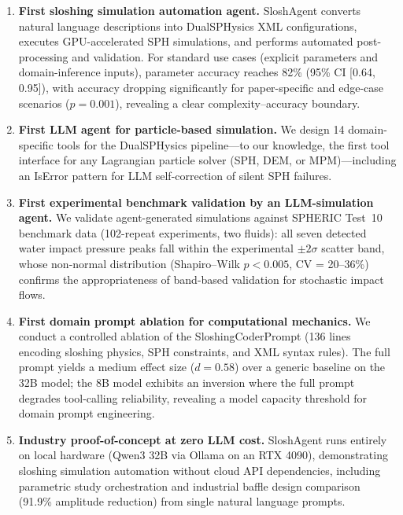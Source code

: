 \documentclass[11pt]{article}
\begin{document}
\begin{enumerate}[noitemsep]
  \item \textbf{First sloshing simulation automation agent.} SloshAgent converts natural language descriptions into DualSPHysics XML configurations, executes GPU-accelerated SPH simulations, and performs automated post-processing and validation. For standard use cases (explicit parameters and domain-inference inputs), parameter accuracy reaches 82\% (95\% CI [0.64, 0.95]), with accuracy dropping significantly for paper-specific and edge-case scenarios ($p = 0.001$), revealing a clear complexity--accuracy boundary.

  \item \textbf{First LLM agent for particle-based simulation.} We design 14 domain-specific tools for the DualSPHysics pipeline---to our knowledge, the first tool interface for any Lagrangian particle solver (SPH, DEM, or MPM)---including an IsError pattern for LLM self-correction of silent SPH failures.

  \item \textbf{First experimental benchmark validation by an LLM-simulation agent.} We validate agent-generated simulations against SPHERIC Test~10 benchmark data (102-repeat experiments, two fluids): all seven detected water impact pressure peaks fall within the experimental $\pm 2\sigma$ scatter band, whose non-normal distribution (Shapiro--Wilk $p < 0.005$, CV = 20--36\%) confirms the appropriateness of band-based validation for stochastic impact flows.

  \item \textbf{First domain prompt ablation for computational mechanics.} We conduct a controlled ablation of the SloshingCoderPrompt (136 lines encoding sloshing physics, SPH constraints, and XML syntax rules). The full prompt yields a medium effect size ($d = 0.58$) over a generic baseline on the 32B model; the 8B model exhibits an inversion where the full prompt degrades tool-calling reliability, revealing a model capacity threshold for domain prompt engineering.

  \item \textbf{Industry proof-of-concept at zero LLM cost.} SloshAgent runs entirely on local hardware (Qwen3 32B via Ollama on an RTX 4090), demonstrating sloshing simulation automation without cloud API dependencies, including parametric study orchestration and industrial baffle design comparison (91.9\% amplitude reduction) from single natural language prompts.
\end{enumerate}
\end{document}
